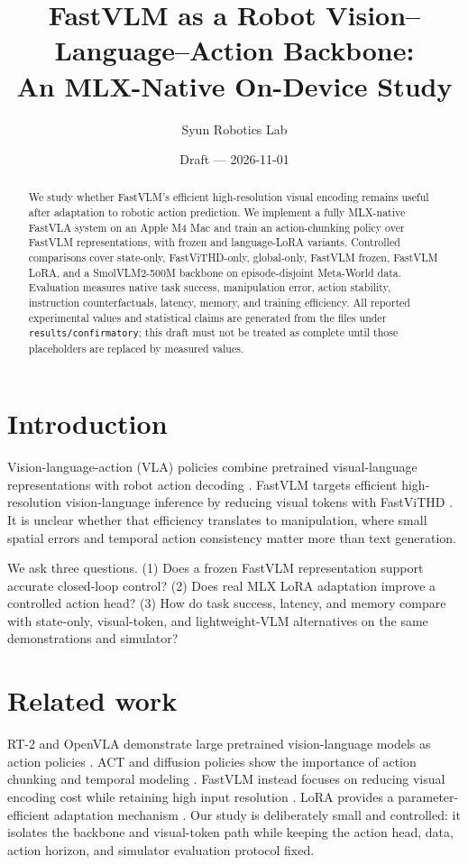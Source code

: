 \documentclass[10pt,letterpaper]{article}
\title{FastVLM as a Robot Vision--Language--Action Backbone:\\ An MLX-Native On-Device Study}
\author{Syun Robotics Lab}
\date{Draft --- 2026-11-01}
\begin{document}
\maketitle

\begin{abstract}
We study whether FastVLM's efficient high-resolution visual encoding remains useful after
adaptation to robotic action prediction. We implement a fully MLX-native FastVLA system on an
Apple M4 Mac and train an action-chunking policy over FastVLM representations, with frozen and
language-LoRA variants. Controlled comparisons cover state-only, FastViTHD-only, global-only,
FastVLM frozen, FastVLM LoRA, and a SmolVLM2-500M backbone on episode-disjoint Meta-World data.
Evaluation measures native task success, manipulation error, action stability, instruction
counterfactuals, latency, memory, and training efficiency. All reported experimental values and
statistical claims are generated from the files under \texttt{results/confirmatory}; this draft
must not be treated as complete until those placeholders are replaced by measured values.
\end{abstract}

\section{Introduction}
Vision-language-action (VLA) policies combine pretrained visual-language representations with
robot action decoding \cite{brohan2023rt2,kim2024openvla,oxe2023}. FastVLM targets efficient
high-resolution vision-language inference by reducing visual tokens with FastViTHD
\cite{fastvlm2025}. It is unclear whether that efficiency translates to manipulation, where
small spatial errors and temporal action consistency matter more than text generation.

We ask three questions. (1) Does a frozen FastVLM representation support accurate closed-loop
control? (2) Does real MLX LoRA adaptation improve a controlled action head? (3) How do task
success, latency, and memory compare with state-only, visual-token, and lightweight-VLM
alternatives on the same demonstrations and simulator?

\section{Related work}
RT-2 and OpenVLA demonstrate large pretrained vision-language models as action policies
\cite{brohan2023rt2,kim2024openvla}. ACT and diffusion policies show the importance of action
chunking and temporal modeling \cite{zhao2023act,chi2023diffusion}. FastVLM instead focuses on
reducing visual encoding cost while retaining high input resolution \cite{fastvlm2025}. LoRA
provides a parameter-efficient adaptation mechanism \cite{hu2021lora}. Our study is deliberately
small and controlled: it isolates the backbone and visual-token path while keeping the action
head, data, action horizon, and simulator evaluation protocol fixed.
\end{document}
